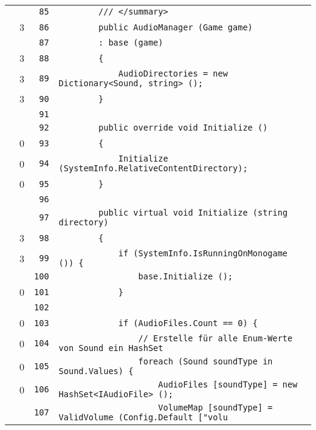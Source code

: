 \documentclass[a4paper,10pt]{article}
\begin{document}
\begin{longtable}[l]{lrrl}
\cellcolor{gray} &  & \verb~85~ & \verb~        /// </summary>~\\
\cellcolor{green} & 3 & \verb~86~ & \verb~        public AudioManager (Game game)~\\
\cellcolor{gray} &  & \verb~87~ & \verb~        : base (game)~\\
\cellcolor{green} & 3 & \verb~88~ & \verb~        {~\\
\cellcolor{green} & 3 & \verb~89~ & \verb~            AudioDirectories = new Dictionary<Sound, string> ();~\\
\cellcolor{green} & 3 & \verb~90~ & \verb~        }~\\
\cellcolor{gray} &  & \verb~91~ & \verb~~\\
\cellcolor{gray} &  & \verb~92~ & \verb~        public override void Initialize ()~\\
\cellcolor{red} & 0 & \verb~93~ & \verb~        {~\\
\cellcolor{red} & 0 & \verb~94~ & \verb~            Initialize (SystemInfo.RelativeContentDirectory);~\\
\cellcolor{red} & 0 & \verb~95~ & \verb~        }~\\
\cellcolor{gray} &  & \verb~96~ & \verb~~\\
\cellcolor{gray} &  & \verb~97~ & \verb~        public virtual void Initialize (string directory)~\\
\cellcolor{green} & 3 & \verb~98~ & \verb~        {~\\
\cellcolor{green} & 3 & \verb~99~ & \verb~            if (SystemInfo.IsRunningOnMonogame ()) {~\\
\cellcolor{gray} &  & \verb~100~ & \verb~                base.Initialize ();~\\
\cellcolor{red} & 0 & \verb~101~ & \verb~            }~\\
\cellcolor{gray} &  & \verb~102~ & \verb~~\\
\cellcolor{red} & 0 & \verb~103~ & \verb~            if (AudioFiles.Count == 0) {~\\
\cellcolor{red} & 0 & \verb~104~ & \verb~                // Erstelle für alle Enum-Werte von Sound ein HashSet~\\
\cellcolor{red} & 0 & \verb~105~ & \verb~                foreach (Sound soundType in Sound.Values) {~\\
\cellcolor{red} & 0 & \verb~106~ & \verb~                    AudioFiles [soundType] = new HashSet<IAudioFile> ();~\\
\cellcolor{gray} &  & \verb~107~ & \verb~                    VolumeMap [soundType] = ValidVolume (Config.Default ["volu~\\

\end{longtable}
\end{document}
